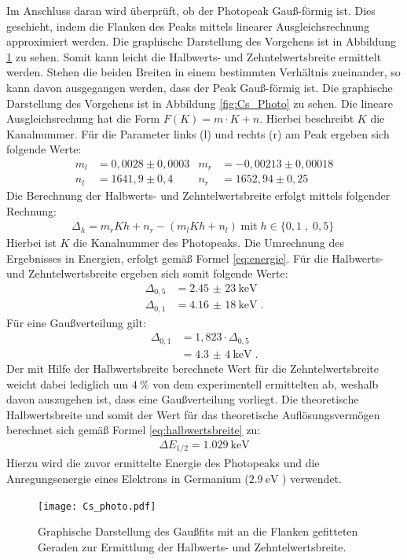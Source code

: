\noindent Im Anschluss daran wird überprüft, ob der Photopeak Gauß-förmig ist.
Dies geschieht, indem die Flanken des Peaks mittels linearer Ausgleichsrechnung approximiert werden. Die graphische Darstellung des Vorgehens ist in Abbildung \ref{fig:Cs_photo} zu sehen.
Somit kann leicht die Halbwerts- und Zehntelwertsbreite ermittelt werden. Stehen die beiden Breiten in einem bestimmten Verhältnis zueinander, so kann davon ausgegangen werden, dass der Peak Gauß-förmig ist.
Die graphische Darstellung des Vorgehens ist in Abbildung \ref{fig:Cs_Photo} zu sehen.
Die lineare Ausgleichsrechung hat die Form $F(K) = m \cdot K + n$. Hierbei beschreibt $K$ die Kanalnummer.
Für die Parameter links (l) und rechts (r) am Peak ergeben sich folgende Werte:
\begin{align*}
    m_l &= 0,0028 \pm 0,0003 & m_r &= -0,00213 \pm 0,00018 \\
    n_l &= 1641,9 \pm 0,4    & n_r &=  1652,94 \pm 0,25
\end{align*}
Die Berechnung der Halbwerts- und Zehntelwertsbreite erfolgt mittels folgender Rechnung:
\begin{align*}
    \Delta_{h} = m_r K h + n_r - (m_l K h + n_l) \; \text{mit} \; h \in \{0,1 \; , \; 0,5\} \;
\end{align*}
Hierbei ist $K$ die Kanalnummer des Photopeaks.
Die Umrechnung des Ergebnisses in Energien, erfolgt gemäß Formel \ref{eq:energie}.
Für die Halbwerts- und Zehntelwertsbreite ergeben sich somit folgende Werte:
\begin{align*}
    \Delta_{0,5} &= \SI{2,45(23)}{\kilo \electronvolt}\\    %
    \Delta_{0,1} &= \SI{4,16(18)}{\kilo \electronvolt} \; . %
\end{align*}
Für eine Gaußverteilung gilt:
\begin{align*}
    \Delta_{0,1} &= 1,823 \cdot \Delta_{0,5} \\
                 &= \SI{4,3(4)}{\kilo \electronvolt} \; .
\end{align*}
Der mit Hilfe der Halbwertsbreite berechnete Wert für die Zehntelwertsbreite weicht
dabei lediglich um $\SI{4}{\percent}$ von dem experimentell ermittelten ab, weshalb
davon auszugehen ist, dass eine Gaußverteilung vorliegt.
Die theoretische Halbwertsbreite und somit der Wert für das theoretische Auflösungsvermögen berechnet sich gemäß Formel \ref{eq:halbwertsbreite} zu:
\FloatBarrier
\begin{align}
    \label{eq:halbwertsbreite_theo}
    \Delta E_{1/2} = \SI{1,029}{\kilo \electronvolt}
\end{align}
\FloatBarrier
Hierzu wird die zuvor ermittelte Energie des Photopeaks und die
Anregungsenergie eines Elektrons in Germanium ($\SI{2,9}{\electronvolt}$ )
verwendet.
\FloatBarrier
\begin{figure}
    \centering
    \texttt{[image: Cs\_photo.pdf]}
    \caption{Graphische Darstellung des Gaußfits mit an die Flanken gefitteten Geraden zur Ermittlung der Halbwerts- und Zehntelwertsbreite.}
    \label{fig:Cs_photo}
\end{figure}
\FloatBarrier

